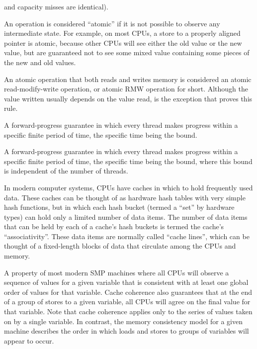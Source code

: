 \begin{description}
	and capacity misses are identical).
\item[\IXG{Atomic}:]
	An operation is considered ``atomic'' if it is not possible to
	observe any intermediate state.
	For example, on most CPUs, a store to a properly aligned pointer
	is atomic, because other CPUs will see either the old value or
	the new value, but are guaranteed not to see some mixed value
	containing some pieces of the new and old values.
\item[\IXG{Atomic Read-Modify-Write Operation}:]
	An atomic operation that both reads and writes memory is
	considered an atomic read-modify-write operation, or atomic RMW
	operation for short.
	Although the value written usually depends on the value read,
	 is the exception that proves this rule.
\item[\IXGh{Bounded}{Wait Free}:]
	A forward-progress guarantee in which every thread makes
	progress within a specific finite period of time, the specific
	time being the bound.
\item[\IXGh{Bounded Population-Oblivious}{Wait Free}:]
	A forward-progress guarantee in which every thread makes
	progress within a specific finite period of time, the specific
	time being the bound, where this bound is independent of the
	number of threads.
\item[\IXG{Cache}:]
	In modern computer systems, CPUs have caches in which to hold
	frequently used data.
	These caches can be thought of as hardware hash tables with very
	simple hash functions,
	but in which each hash bucket (termed a ``set'' by hardware types)
	can hold only a limited number of data items.
	The number of data items that can be held by each of a cache's hash
	buckets is termed the cache's ``associativity''.
	These data items are normally called ``cache lines'', which
	can be thought of a fixed-length blocks of data that circulate
	among the CPUs and memory.
\item[\IXG{Cache Coherence}:]
	A property of most modern SMP machines where all CPUs will
	observe a sequence of values for a given variable that is
	consistent with at least one global order of values for
	that variable.
	Cache coherence also guarantees that at the end of a group
	of stores to a given variable, all CPUs will agree
	on the final value for that variable.
	Note that cache coherence applies only to the series of values
	taken on by a single variable.
	In contrast, the memory consistency model for a given machine
	describes the order in which loads and stores to groups of
	variables will appear to occur.

\end{description}
